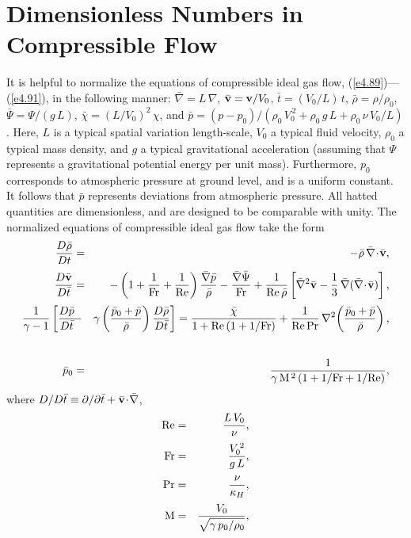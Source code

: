 \section{Dimensionless Numbers in Compressible Flow}\label{scomp}
It is helpful to normalize the equations of compressible ideal gas flow, (\ref{e4.89})---(\ref{e4.91}), in the following
manner: $\bar{\nabla} = L\,\nabla$, $\bar{\bf v} = {\bf v}/V_0$, $\bar{t} = (V_0/L)\,t$, $\bar{\rho}=\rho/\rho_0$, $\bar{\Psi} = \Psi/(g\,L)$, $\bar{\chi} = (L/V_0)^2\,\chi$, and $\bar{p} = (p-p_0)/(\rho_0\,V_0^{\,2} +\rho_0\,g\,L+ \rho_0\,\nu\,V_0/L)$. Here, $L$ is a typical spatial variation length-scale,  $V_0$ 
a typical fluid velocity, $\rho_0$  a typical mass density, and $g$ a typical gravitational acceleration (assuming that $\Psi$ represents a gravitational
potential energy per unit mass). Furthermore, $p_0$ corresponds to atmospheric pressure at ground level, and is a uniform
constant. It follows that $\bar{p}$ represents  deviations from atmospheric pressure.
All hatted quantities are  dimensionless, and are designed to be comparable with unity. 
The normalized equations of compressible ideal gas flow take the form
\begin{eqnarray}\label{e4.97}
\frac{D\bar{\rho}}{Dt}&=& -\bar{\rho}\,\bar{\nabla}\!\cdot\!\bar{\bf v},\\[0.5ex]
\frac{D\bar{\bf v}}{D\bar{t}}&=&   - \left(1+\frac{1}{{\rm Fr}}+\frac{1}{{\rm Re}}\right)\frac{\bar{\nabla}\bar{p}}{\bar{\rho}}-\frac{\bar{\nabla}\bar{\Psi}}{\rm Fr} + \frac{1}{{\rm Re}\,\bar{\rho}}\left[\bar{\nabla}^2 \bar{\bf v}-\frac{1}{3}\,\bar{\nabla}(\bar{\nabla}\!\cdot\!\bar{\bf v})\right],\label{e4.97x}\\[0.5ex]
\frac{1}{\gamma-1}\left[\frac{D\bar{p}}{D\bar{t}}\right.\!\!&-&\!\! \left.\gamma\left(\frac{\bar{p}_0+\bar{p}}{\bar{\rho}}\right)\frac{D\bar{\rho}}{D\bar{t}}\right]=\frac{\bar{\chi}}{1+{\rm Re}\,(1+1/{\rm Fr})}+ \frac{1}{{\rm Re}\,{\rm Pr}}\,\nabla^2\!\left(
\frac{\bar{p}_0 + \bar{p}}{\bar{\rho}}\right),\nonumber\\[0.5ex]&&\label{e4.98}\\[0.5ex]
\bar{p}_0 &=& \frac{1}{\gamma\,{\rm M}^{\,2}\,(1+1/{\rm Fr}+1/{\rm Re})},\label{e4.99}
\end{eqnarray}
where $D/D\bar{t}\equiv \partial/\partial \bar{t} + \bar{\bf v}\!\cdot\!\bar{\nabla}$, 
\begin{eqnarray}
{\rm Re} &=& \frac{L\,V_0}{\nu},\\[0.5ex]
{\rm Fr} &=& \frac{V_0^{\,2}}{g\,L},\\[0.5ex]
{\rm Pr} &=& \frac{\nu}{\kappa_H},\\[0.5ex]
{\rm M} &=& \frac{V_0}{\sqrt{\gamma\,p_0/\rho_0}},
\end{eqnarray}

